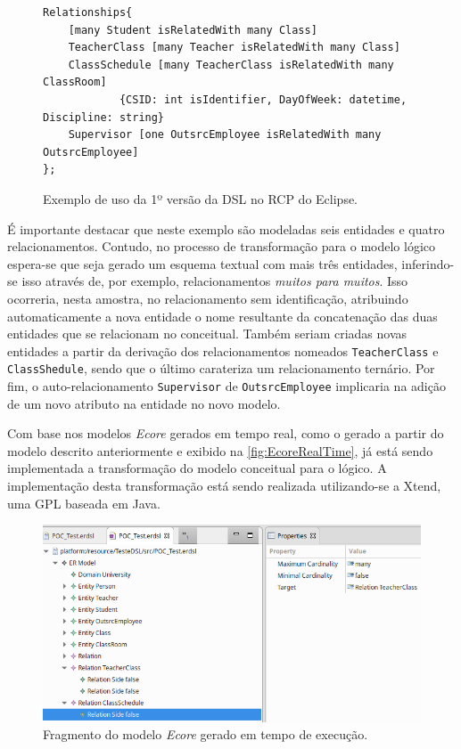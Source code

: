 \begin{figure}[!htb]
\centering
\caption{Exemplo de uso da 1º versão da DSL no RCP do Eclipse.}
\label{fig:DSLvs1Uso}
\begin{scriptsize}
\begin{lstlisting}[language = ERDSL, frame = trbl]
Relationships{	 
	[many Student isRelatedWith many Class]
	TeacherClass [many Teacher isRelatedWith many Class]
	ClassSchedule [many TeacherClass isRelatedWith many ClassRoom]
	        {CSID: int isIdentifier, DayOfWeek: datetime, Discipline: string}
	Supervisor [one OutsrcEmployee isRelatedWith many OutsrcEmployee]
};
\end{lstlisting}
\end{scriptsize}
\end{figure}
É importante destacar que neste exemplo são modeladas seis entidades e quatro relacionamentos. 
Contudo, no processo de transformação para o modelo lógico espera-se que seja gerado um esquema textual com mais três entidades, inferindo-se isso através de, por exemplo, relacionamentos \textit{muitos para muitos}. 
Isso ocorreria, nesta amostra, no relacionamento sem identificação, atribuindo automaticamente a nova entidade o nome resultante da concatenação das duas entidades que se relacionam no conceitual. 
Também seriam criadas novas entidades a partir da derivação dos relacionamentos nomeados \texttt{TeacherClass} e \texttt{ClassShedule}, sendo que o último carateriza um relacionamento ternário.
Por fim, o auto-relacionamento \texttt{Supervisor} de \texttt{OutsrcEmployee} implicaria na adição de um novo atributo na entidade no novo modelo.

Com base nos modelos \textit{Ecore} gerados em tempo real, como o gerado a partir do modelo descrito anteriormente e exibido na \autoref{fig:EcoreRealTime}, já está sendo implementada a transformação do modelo conceitual para o lógico. 
A implementação desta transformação está sendo realizada utilizando-se a Xtend, uma \ac{GPL} baseada em Java.

\begin{figure} [!htb]
    \centering
    \caption{Fragmento do modelo \textit{Ecore} gerado em tempo de execução.}
    \label{fig:EcoreRealTime}
    \includegraphics[width=\textwidth]{img/EcoreTempoReal.png}
\end{figure}


